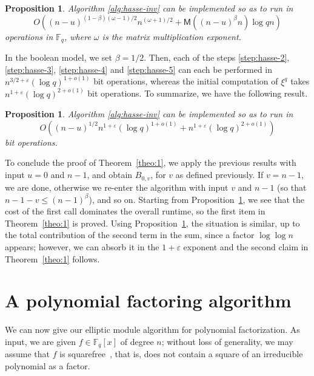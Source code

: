 \documentclass[12pt]{article}
\theoremstyle{plain}
\newtheorem{proposition}[theorem]{Proposition}
\theoremstyle{definition}
\def\F{\ensuremath{\mathbb{F}}}
\def\MM{\ensuremath{\mathsf{M}}}
\begin{document}
\begin{proposition}
  \label{theo:hasse-inv}
  Algorithm \ref{alg:hasse-inv} can be implemented so as to run in
  \[O((n-u)^{(1 - \beta)(\omega - 1) / 2} n^{(\omega + 1) / 2} + \MM((n-u)^{\beta}n)\log qn)\] 
  operations in $\F_q$, where $\omega$ is the matrix multiplication exponent.
\end{proposition}
In the boolean model, we set $\beta = 1/2$. Then, each of the steps
\ref{step:hasse-2}, \ref{step:hasse-3}, \ref{step:hasse-4} and
\ref{step:hasse-5} can each be performed in $n^{3/2+\varepsilon} (\log
q)^{1+o(1)}$ bit operations, whereas the initial computation of
$\xi^q$ takes $ n^{1+\varepsilon} (\log q)^{2+o(1)}$ bit operations. To
summarize, we have the following result.
 
\begin{proposition}
  \label{theo:hasse-inv-bit}
  Algorithm \ref{alg:hasse-inv} can be implemented so as to run in
  \[O((n-u)^{1/2} n^{1+\varepsilon} (\log q)^{1+o(1)} + n^{1+\varepsilon} (\log q)^{2+o(1)})\]
  bit operations.
\end{proposition}

To conclude the proof of Theorem~\ref{theo:1}, we apply the previous
results with input $u=0$ and $n-1$, and obtain $B_{0,v}$, for $v$ as
defined previously. If $v=n-1$, we are done, otherwise we re-enter the
algorithm with input $v$ and $n-1$ (so that $n-1-v \le
(n-1)^\beta$), and so on. Starting from Proposition~\ref{theo:hasse-inv},
we see that the cost of the first call dominates the
overall runtime, so the first item in Theorem~\ref{theo:1} is proved.
Using Proposition~\ref{theo:hasse-inv-bit}, the situation is similar,
up to the total contribution of the second term in the sum, since a factor
$\log\log n$ appears; however, we can absorb it in the $1+\varepsilon$ 
exponent and the second claim in Theorem~\ref{theo:1} follows.



\section{A polynomial factoring algorithm}\label{randomized_section}

We can now give our elliptic module algorithm for polynomial
factorization. As input, we are given $f \in\F_q[x]$ of degree $n$;
without loss of generality, we may assume that $f$ is
squarefree~\cite{knu,yun}, that is, does not contain a square of an
irreducible polynomial as a factor.
\end{document}
